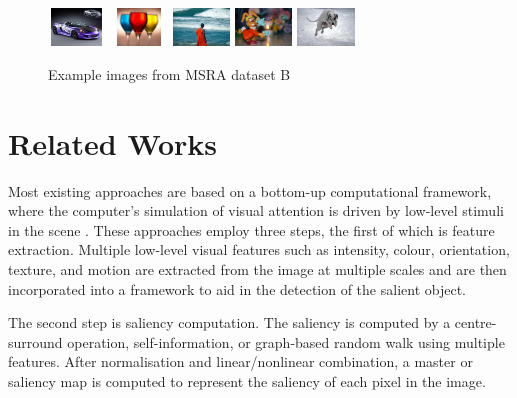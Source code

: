 \documentclass[10pt,twocolumn,letterpaper]{article}
\begin{document}
\begin{figure}[h]
\begin{center}
    \includegraphics[width=0.6in,height=0.4in]{./Figures/example_image/4_142_142916.jpg}
    \includegraphics[width=0.6in,height=0.4in]{./Figures/example_image/4_143_143262.jpg}
    \includegraphics[width=0.6in,height=0.4in]{./Figures/example_image/4_144_144604.jpg}
    \includegraphics[width=0.6in,height=0.4in]{./Figures/example_image/4_134_134777.jpg}
    \includegraphics[width=0.6in,height=0.4in]{./Figures/example_image/4_134_134664.jpg}\\
    \caption{Example images from MSRA dataset B} \label{fig:MSRA}

    \end{center}
\end{figure}

\section{Related Works}
Most existing approaches are based on a bottom-up computational framework, where the computer's simulation of visual attention is driven by low-level stimuli in the scene \cite{ittiphd}\cite{itti}\cite{fuzzy}. These approaches employ three steps, the first of which is feature extraction.  Multiple low-level visual features such as intensity, colour, orientation, texture, and motion are extracted from the image at multiple scales and are then incorporated into a framework to aid in the detection of the salient object.

The second step is saliency computation. The saliency is computed by a centre-surround operation, self-information, or graph-based random walk using multiple features. After normalisation and linear/nonlinear combination, a master or saliency map is computed to represent the saliency of each pixel in the image. 
\end{document}
